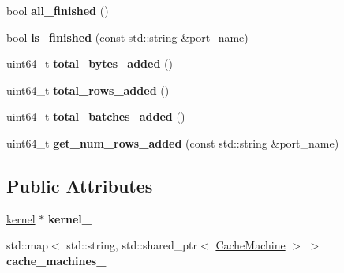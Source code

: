 \begin{DoxyCompactItemize}
\item 
\mbox{\label{classral_1_1cache_1_1port_a682aff9077c4da30de69e9449feb89ec}} 
bool {\bfseries all\+\_\+finished} ()
\item 
\mbox{\label{classral_1_1cache_1_1port_afebcebbb24ccd91b52275dd442cb2bd2}} 
bool {\bfseries is\+\_\+finished} (const std\+::string \&port\+\_\+name)
\item 
\mbox{\label{classral_1_1cache_1_1port_a5a76f7c5a0a22ba25000eb86b66c7676}} 
uint64\+\_\+t {\bfseries total\+\_\+bytes\+\_\+added} ()
\item 
\mbox{\label{classral_1_1cache_1_1port_a50ec17f630388609cd1d307a5adf3c5c}} 
uint64\+\_\+t {\bfseries total\+\_\+rows\+\_\+added} ()
\item 
\mbox{\label{classral_1_1cache_1_1port_a412d716db14f528c7a3e655c61b2da6a}} 
uint64\+\_\+t {\bfseries total\+\_\+batches\+\_\+added} ()
\item 
\mbox{\label{classral_1_1cache_1_1port_ac03157848a06e12eb28ad8f815d821c8}} 
uint64\+\_\+t {\bfseries get\+\_\+num\+\_\+rows\+\_\+added} (const std\+::string \&port\+\_\+name)
\end{DoxyCompactItemize}
\subsection*{Public Attributes}
\begin{DoxyCompactItemize}
\item 
\mbox{\label{classral_1_1cache_1_1port_ac8e579e7b4a5e0e9ee1051694b732708}} 
\hyperlink{classral_1_1cache_1_1kernel}{kernel} $\ast$ {\bfseries kernel\+\_\+}
\item 
\mbox{\label{classral_1_1cache_1_1port_a8e70bbfe6180959f21a56bd76a6b743b}} 
std\+::map$<$ std\+::string, std\+::shared\+\_\+ptr$<$ \hyperlink{classral_1_1cache_1_1CacheMachine}{Cache\+Machine} $>$ $>$ {\bfseries cache\+\_\+machines\+\_\+}
\end{DoxyCompactItemize}


